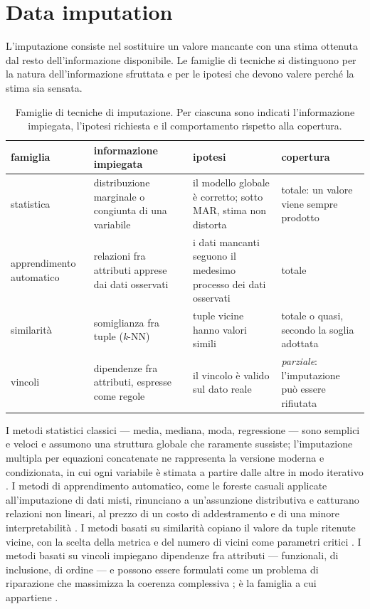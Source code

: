 \section{Data imputation}\label{sec:imputation}

L'imputazione consiste nel sostituire un valore mancante con una stima ottenuta dal resto
dell'informazione disponibile. Le famiglie di tecniche si distinguono per la natura
dell'informazione sfruttata e per le ipotesi che devono valere perché la stima sia sensata.

\begin{table}[htbp]
\centering
\caption{Famiglie di tecniche di imputazione. Per ciascuna sono indicati l'informazione
impiegata, l'ipotesi richiesta e il comportamento rispetto alla copertura.}
\label{tab:imputation-families}
\footnotesize
\begin{tabular}{@{}lp{2.6cm}p{3.2cm}p{2.5cm}@{}}
\toprule
famiglia & informazione impiegata & ipotesi & copertura \\
\midrule
statistica & distribuzione marginale o congiunta di una variabile & il modello globale è corretto;
sotto MAR, stima non distorta & totale: un valore viene sempre prodotto \\
apprendimento automatico & relazioni fra attributi apprese dai dati osservati & i dati mancanti
seguono il medesimo processo dei dati osservati & totale \\
similarità & somiglianza fra tuple (\emph{k}-NN) & tuple vicine hanno valori simili & totale o
quasi, secondo la soglia adottata \\
vincoli & dipendenze fra attributi, espresse come regole & il vincolo è valido sul dato reale &
\emph{parziale}: l'imputazione può essere rifiutata \\
\bottomrule
\end{tabular}
\end{table}

I metodi statistici classici --- media, mediana, moda, regressione --- sono semplici e veloci e
assumono una struttura globale che raramente sussiste; l'imputazione multipla per equazioni
concatenate ne rappresenta la versione moderna e condizionata, in cui ogni variabile è stimata a
partire dalle altre in modo iterativo \cite{vanbuuren2011mice}. I metodi di apprendimento
automatico, come le foreste casuali applicate all'imputazione di dati misti, rinunciano a
un'assunzione distributiva e catturano relazioni non lineari, al prezzo di un costo di
addestramento e di una minore interpretabilità \cite{stekhoven2012missforest}. I metodi basati su
similarità copiano il valore da tuple ritenute vicine, con la scelta della metrica e del numero di
vicini come parametri critici \cite{troyanskaya2001missing}. I metodi basati su vincoli
impiegano dipendenze fra attributi --- funzionali, di inclusione, di ordine --- e possono essere
formulati come un problema di riparazione che massimizza la coerenza complessiva
\cite{rekatsinas2017holoclean, fan2012foundations}; è la famiglia a cui appartiene \renuver{}.

